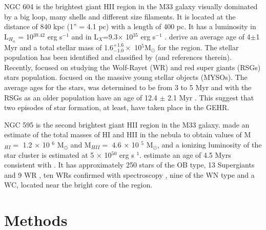 \documentclass[fleqn,usenatbib, useAMS, a4paper]{mnras}
\begin{document}
NGC 604 is the brightest giant HII region in the M33 galaxy visually dominated by a big loop, many shells and different size filaments.
It is located at the distance of 840 kpc (1'' = 4.1 pc) \citep{2015KamKinematics} with a length of 400 pc.
It has a luminosity in L$_{H_\alpha}$ = 10$^{39.42}$ erg s$^{-1}$ \citep{2002MNRAS.329..481B} and in L$_{X}$=9.3$\times$ 10$^{35}$ erg s$^{-1}$ \citep{2008ApJ...685..919T}.
\citet{2012ApJ...761....3M} derive an average age of 4$\pm$1 Myr and a total stellar mass of 1.6$^{+1.6}_{-1.0} \times$ 10$^{5}$M$_{\odot}$ for the region.
The stellar population has been identified and classified by \citet{1996ApJ...456..174H} (and references therein).
Recently, \citet{2011MNRAS.411..235E} focused on studying the Wolf-Rayet (WR) and red super giants (RSGs) stars population.
\citet{2012AJ....143...43F} focused on the massive young stellar objects (MYSOs).
The average ages for the stars, was determined to be from 3 to 5 Myr \citep{1996ApJ...456..174H} and with the RSGs as an older population have an age of 12.4 $\pm$ 2.1 Myr \citep{2011MNRAS.411..235E}.
This suggest that two episodes of star formation, at least, have taken place in the GEHR.

NGC 595 is the second brightest giant HII region in the M33 galaxy.
\citet{1983A&A...119..185V} made an estimate of the total masses of HI and HII in the nebula to obtain values of M$_{HI}=$ 1.2 $\times$ 10 $^{6}$ M$_{\odot}$ and M$_{HII} =$ 4.6 $\times$ 10 $^{5}$ M$_{\odot}$, and a ionizing luminosity of the star cluster is estimated at 5 $\times$ 10$^{50}$ erg s $^{1}$.
\citet{1996AJ....111.1128M} estimate an age of 4.5 Myrs consistent with \citet{1993AJ....105.1400D}.
It has approximately 250 stars of the OB type, 13 Supergiants and 9 WR \citep{1996AJ....111.1128M}, ten WRs confirmed with spectroscopy \citet{1993AJ....105.1400D}, nine of the WN type and a WC, located near the bright core of the region.





\section{Methods}\label{sec:met}
\end{document}

